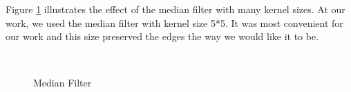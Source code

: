 \documentclass[12pt,fleqn]{book} %
\begin{document}
Figure \ref{fig:fig8} illustrates the effect of the median filter with many kernel sizes. At our 
work, we used the median filter with kernel size 5*5. It was most convenient for our work and 
this size preserved the edges the way we would like it to be. 
\begin{figure}[h]
\begin{dBox}
\centering
  \mbox{
   }
   \caption{Median Filter \label{fig:fig8} }   
\end{dBox}   
\end{figure}
\end{document}
